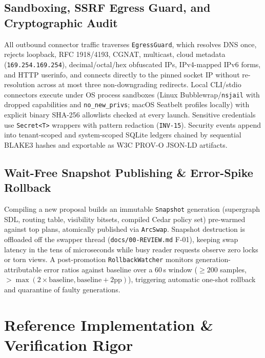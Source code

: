 \documentclass[10pt,twocolumn]{article}
\begin{document}
\subsection{Sandboxing, SSRF Egress Guard, and Cryptographic Audit}
All outbound connector traffic traverses \texttt{EgressGuard}, which resolves DNS once, rejects loopback, RFC 1918/4193, CGNAT, multicast, cloud metadata (\texttt{169.254.169.254}), decimal/octal/hex obfuscated IPs, IPv4-mapped IPv6 forms, and HTTP userinfo, and connects directly to the pinned socket IP without re-resolution across at most three non-downgrading redirects. Local CLI/stdio connectors execute under OS process sandboxes (Linux Bubblewrap/\texttt{nsjail} with dropped capabilities and \texttt{no\_new\_privs}; macOS Seatbelt profiles locally) with explicit binary SHA-256 allowlists checked at every launch. Sensitive credentials use \texttt{Secret<T>} wrappers with pattern redaction (\texttt{INV-15}). Security events append into tenant-scoped and system-scoped SQLite ledgers chained by sequential BLAKE3 hashes and exportable as W3C PROV-O JSON-LD artifacts.

\subsection{Wait-Free Snapshot Publishing \& Error-Spike Rollback}
Compiling a new proposal builds an immutable \texttt{Snapshot} generation (supergraph SDL, routing table, visibility bitsets, compiled Cedar policy set) pre-warmed against top plans, atomically published via \texttt{ArcSwap}. Snapshot destruction is offloaded off the swapper thread (\texttt{docs/00-REVIEW.md} F-01), keeping swap latency in the tens of microseconds while busy reader requests observe zero locks or torn views. A post-promotion \texttt{RollbackWatcher} monitors generation-attributable error ratios against baseline over a 60\,s window ($\ge 200$ samples, $> \max(2\times\text{baseline}, \text{baseline} + 2\text{pp})$), triggering automatic one-shot rollback and quarantine of faulty generations.

\section{Reference Implementation \& Verification Rigor}
\label{sec:impl}
\end{document}
